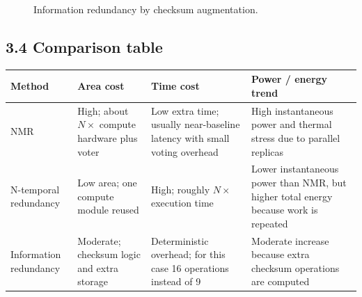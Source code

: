\documentclass[11pt,a4paper]{article}
\begin{document}
\begin{figure}[h!]
\centering
{}
\caption{Information redundancy by checksum augmentation.}
\end{figure}

\subsection*{3.4 Comparison table}
\begin{center}
\begin{tabular}{>{\raggedright\arraybackslash}p{3cm} >{\raggedright\arraybackslash}p{3.2cm} >{\raggedright\arraybackslash}p{3cm} >{\raggedright\arraybackslash}p{3.2cm}}
\toprule
Method & Area cost & Time cost & Power / energy trend \\
\midrule
NMR & High; about $N\times$ compute hardware plus voter & Low extra time; usually near-baseline latency with small voting overhead & High instantaneous power and thermal stress due to parallel replicas \\
N-temporal redundancy & Low area; one compute module reused & High; roughly $N\times$ execution time & Lower instantaneous power than NMR, but higher total energy because work is repeated \\
Information redundancy & Moderate; checksum logic and extra storage & Deterministic overhead; for this case 16 operations instead of 9 & Moderate increase because extra checksum operations are computed \\
\bottomrule
\end{tabular}
\end{center}
\end{document}
